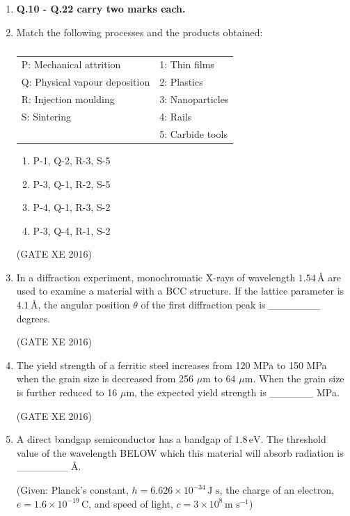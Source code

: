 \documentclass[12pt]{article}
\begin{document}
\begin{enumerate}
\item[] \textbf{Q.10 - Q.22 carry two marks each.}

\item Match the following processes and the products obtained:  

\begin{table}[H]
\centering
\caption{}
\label{}
\begin{tabular}{ll}
P: Mechanical attrition & 1: Thin films \\
Q: Physical vapour deposition & 2: Plastics \\
R: Injection moulding & 3: Nanoparticles \\
S: Sintering & 4: Rails \\
 & 5: Carbide tools \\
\end{tabular}
\end{table}

\begin{multicols}{2}
\begin{enumerate}
  \item P-1, Q-2, R-3, S-5
  \item P-3, Q-1, R-2, S-5
  \item P-4, Q-1, R-3, S-2
  \item P-3, Q-4, R-1, S-2
\end{enumerate}
\end{multicols}
(GATE XE 2016)

\item In a diffraction experiment, monochromatic X-rays of wavelength $1.54 \, \text{\AA}$ are used to examine a material with a BCC structure. If the lattice parameter is $4.1 \, \text{\AA}$, the angular position $\theta$ of the first diffraction peak is \_\_\_\_\_\_\_ degrees.  

(GATE XE 2016)

\item The yield strength of a ferritic steel increases from 120 MPa to 150 MPa when the grain size is decreased from 256 $\mu$m to 64 $\mu$m. When the grain size is further reduced to 16 $\mu$m, the expected yield strength is \_\_\_\_\_\_ MPa.  

(GATE XE 2016)

\item A direct bandgap semiconductor has a bandgap of $1.8 \, \text{eV}$. The threshold value of the wavelength BELOW which this material will absorb radiation is \_\_\_\_\_\_\_ \AA.  

(Given: Planck’s constant, $h = 6.626 \times 10^{-34} \, \text{J s}$, the charge of an electron, $e = 1.6 \times 10^{-19} \, \text{C}$, and speed of light, $c = 3 \times 10^{8} \, \text{m s}^{-1}$)  


\end{enumerate}
\end{document}
